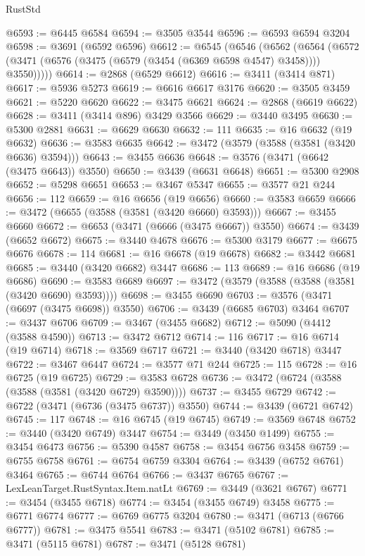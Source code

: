 \begin{lexlean}{RustStd}
\begin{coremodule}
{{{{{{{{{{{{{{{{{{{@6593 := @6445 @6584
@6594 := @3505 @3544
@6596 := @6593 @6594 @3204
@6598 := @3691 (@6592 @6596)
@6612 := @6545
    (@6546
      (@6562
        (@6564 (@6572 (@3471 (@6576 (@3475 (@6579 (@3454 (@6369 @6598 @4547) @3458)))) @3550)))))
@6614 := @2868 (@6529 @6612)
@6616 := @3411 (@3414 @871)
@6617 := @5936 @5273
@6619 := @6616 @6617 @3176
@6620 := @3505 @3459
@6621 := @5220 @6620
@6622 := @3475 @6621
@6624 := @2868 (@6619 @6622)
@6628 := @3411 (@3414 @896) @3429 @3566
@6629 := @3440 @3495
@6630 := @5300 @2881
@6631 := @6629 @6630
@6632 := 111
@6635 := @16 @6632 (@19 @6632)
@6636 := @3583 @6635
@6642 := @3472 (@3579 (@3588 (@3581 (@3420 @6636) @3594)))
@6643 := @3455 @6636
@6648 := @3576 (@3471 (@6642 (@3475 @6643)) @3550)
@6650 := @3439 (@6631 @6648)
@6651 := @5300 @2908
@6652 := @5298 @6651
@6653 := @3467 @5347
@6655 := @3577 @21 @244
@6656 := 112
@6659 := @16 @6656 (@19 @6656)
@6660 := @3583 @6659
@6666 := @3472 (@6655 (@3588 (@3581 (@3420 @6660) @3593)))
@6667 := @3455 @6660
@6672 := @6653 (@3471 (@6666 (@3475 @6667)) @3550)
@6674 := @3439 (@6652 @6672)
@6675 := @3440 @4678
@6676 := @5300 @3179
@6677 := @6675 @6676
@6678 := 114
@6681 := @16 @6678 (@19 @6678)
@6682 := @3442 @6681
@6685 := @3440 (@3420 @6682) @3447
@6686 := 113
@6689 := @16 @6686 (@19 @6686)
@6690 := @3583 @6689
@6697 := @3472 (@3579 (@3588 (@3588 (@3581 (@3420 @6690) @3593))))
@6698 := @3455 @6690
@6703 := @3576 (@3471 (@6697 (@3475 @6698)) @3550)
@6706 := @3439 (@6685 @6703) @3464
@6707 := @3437 @6706
@6709 := @3467 (@3455 @6682)
@6712 := @5090 (@4412 (@3588 @4590))
@6713 := @3472 @6712
@6714 := 116
@6717 := @16 @6714 (@19 @6714)
@6718 := @3569 @6717
@6721 := @3440 (@3420 @6718) @3447
@6722 := @3467 @6447
@6724 := @3577 @71 @244
@6725 := 115
@6728 := @16 @6725 (@19 @6725)
@6729 := @3583 @6728
@6736 := @3472 (@6724 (@3588 (@3588 (@3581 (@3420 @6729) @3590))))
@6737 := @3455 @6729
@6742 := @6722 (@3471 (@6736 (@3475 @6737)) @3550)
@6744 := @3439 (@6721 @6742)
@6745 := 117
@6748 := @16 @6745 (@19 @6745)
@6749 := @3569 @6748
@6752 := @3440 (@3420 @6749) @3447
@6754 := @3449 (@3450 @1499)
@6755 := @3454 @6473
@6756 := @5390 @4587
@6758 := @3454 @6756 @3458
@6759 := @6755 @6758
@6761 := @6754 @6759 @3304
@6764 := @3439 (@6752 @6761) @3464
@6765 := @6744 @6764
@6766 := @3437 @6765
@6767 := LexLeanTarget.RustSyntax.Item.natLt
@6769 := @3449 (@3621 @6767)
@6771 := @3454 (@3455 @6718)
@6774 := @3454 (@3455 @6749) @3458
@6775 := @6771 @6774
@6777 := @6769 @6775 @3204
@6780 := @3471 (@6713 (@6766 @6777))
@6781 := @3475 @5541
@6783 := @3471 (@5102 @6781)
@6785 := @3471 (@5115 @6781)
@6787 := @3471 (@5128 @6781)
}}}}}}}}}}}}}}}}}}}
\end{coremodule}
\end{lexlean}
